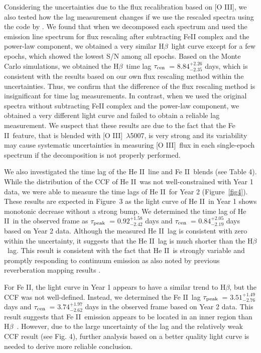 \documentclass[iop]{emulateapj}
\newcommand{\Hb}{\rm H{$\beta$}}
\newcommand{\OIII}{[O {\small III}]}
\newcommand{\FeII}{Fe {\small II}}
\newcommand{\HeII}{He {\small II}}
\newcommand{\lagcen}{$\tau_{\rm cen}$}
\newcommand{\lagpeak}{$\tau_{\rm peak}$}
\begin{document}
Considering the uncertainties due to the flux recalibration based on \OIII, we also tested how the lag measurement changes if we use the rescaled spectra using the code by \citet{Fausnaugh2016}. We found that when we decomposed each spectrum and used the emission line spectrum for flux rescaling after subtracting FeII complex and the power-law component, we obtained a very similar \Hb\ light curve except for a few epochs, which showed the lowest S/N among all epochs. Based on the Monte Carlo simulations, we obtained the \Hb\ time lag \lagcen\ = $8.84^{+2.26}_{-2.35}$ days, which is consistent with the results based on our own flux rescaling
method within the uncertainties. Thus, we confirm that the difference of the flux rescaling method is insignificant for time lag measurements. In contrast, when we used the original spectra without subtracting FeII complex and the power-law component, we obtained a very different light curve and failed to obtain a reliable lag measurement. We suspect that these results are due to the fact that the \FeII\ feature, that is blended with \OIII\ $\lambda$5007, is very strong and its variability may cause systematic uncertainties in measuring \OIII\ flux in each single-epoch spectrum if the decomposition is not properly performed. 

We also investigated the time lag of the \HeII\ line and \FeII\ blends (see Table 4).
While the distribution of the CCF of \HeII\ was not well-constrained with Year 1 data, we were able to measure the time lags of \HeII\  
for Year 2 (Figure~\ref{fig4}). These results are expected in Figure~3 as the light curve of \HeII\ in Year 1 shows monotonic decrease without a strong bump. 
We determined the time lag of \HeII\ in the observed frame as \lagpeak\ = $0.92^{+1.58}_{-2.42}$ days and \lagcen\ = $0.84^{+2.05}_{-2.19}$ days based on Year 2 data.
Although the measured \HeII\ lag is consistent with zero within the uncertainty, it suggests that the \HeII\ lag is much shorter than the \Hb\ lag. 
This result is consistent with the fact that \HeII\ is strongly variable  and promptly responding to continuum emission as also noted by previous reverberation mapping results \citep{PetersonFerland1986,Kollatschny2003,Pei2014,Barth2015}.

For \FeII, the light curve in Year 1 appears to have a similar trend to \Hb, but the CCF was not well-defined.
Instead, we determined the \FeII\ lag \lagpeak\ = $3.51^{+1.49}_{-2.76}$ days and \lagcen\ = $3.74^{+1.97}_{-2.62}$ days in 
the observed frame based on Year 2 data. This result  suggests that 
\FeII\ emission appears to be located in an inner region than \Hb\ \citep[cf.][]{Barth2013,Hu2015}. However, due to the large
uncertainty of the lag and the relatively weak CCF result (see Fig. 4), further analysis based on a better quality light curve is needed
to derive more reliable conclusion.
\end{document}
